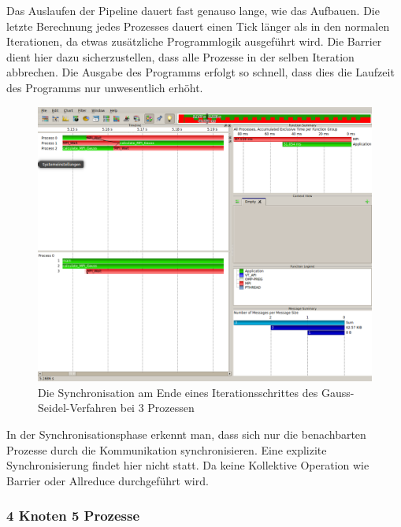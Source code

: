 \documentclass[a4paper,12pt]{scrartcl}
\begin{document}
Das Auslaufen der Pipeline dauert fast genauso lange, wie das Aufbauen. Die letzte Berechnung jedes Prozesses dauert einen Tick länger als in den normalen Iterationen, da etwas zusätzliche Programmlogik ausgeführt wird. Die Barrier dient hier dazu sicherzustellen, dass alle Prozesse in der selben Iteration abbrechen. Die Ausgabe des Programms erfolgt so schnell, dass dies die Laufzeit des Programms nur unwesentlich erhöht.
\FloatBarrier
\begin{figure}[hr!]
 \includegraphics[scale=0.45]{./3_2_GS/Syncronize.png}
 \caption{Die Synchronisation am Ende eines Iterationsschrittes des Gauss-Seidel-Verfahren bei 3 Prozessen}
\end{figure}
In der Synchronisationsphase erkennt man, dass sich nur die benachbarten Prozesse durch die Kommunikation synchronisieren. Eine explizite Synchronisierung findet hier nicht statt. Da keine Kollektive Operation wie Barrier oder Allreduce durchgeführt wird.  
\FloatBarrier
\subsubsection{4 Knoten 5 Prozesse}
\end{document}
